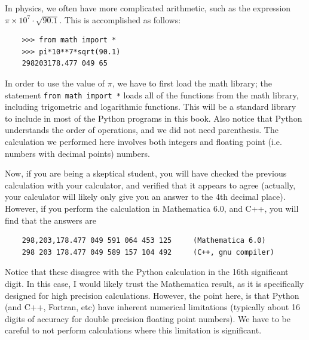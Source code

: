 In physics, we often have more complicated arithmetic, such as the expression $\pi\times 10^{7} \cdot \sqrt{90.1}$. This is accomplished as follows: 
\small\begin{verbatim}
	>>> from math import *
	>>> pi*10**7*sqrt(90.1)
	298203178.477 049 65
\end{verbatim}\normalsize
In order to use the value of $\pi$, we have to first load the math library; the statement \texttt{from math import *} loads all of the functions from the math library, including trigometric and logarithmic functions. This will be a standard library to include in most of the Python programs in this book. 
Also notice that Python understands the order of operations, and we did not need parenthesis. The calculation we performed here involves both integers and floating point (i.e. numbers with decimal points) numbers. 

Now, if you are being a skeptical student, you will have checked the previous calculation with your calculator, and verified that it appears to agree (actually, your calculator will likely only give you an answer to the 4th decimal place). However, if you perform the calculation in Mathematica 6.0, and C++, you will find that the answers are 
\small\begin{verbatim}
	298,203,178.477 049 591 064 453 125		(Mathematica 6.0)
	298 203 178.477 049 589 157 104 492 	(C++, gnu compiler)	
\end{verbatim}\normalsize
Notice that these disagree with the Python calculation in the 16th significant digit. In this case, I would likely trust the Mathematica result, as it is specifically designed for high precision calculations. However, the point here, is that Python (and C++, Fortran, etc) have inherent numerical limitations (typically about 16 digits of accuracy for double precision floating point numbers). We have to be careful to not perform calculations where this limitation is significant.

